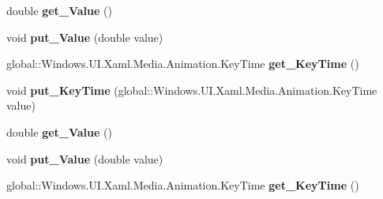 \begin{DoxyCompactItemize}
double {\bfseries get\+\_\+\+Value} ()
\item 
\mbox{\label{interface_windows_1_1_u_i_1_1_xaml_1_1_media_1_1_animation_1_1_i_double_key_frame_a2e2235aea49078188c36c1f9080d58a9}} 
void {\bfseries put\+\_\+\+Value} (double value)
\item 
\mbox{\label{interface_windows_1_1_u_i_1_1_xaml_1_1_media_1_1_animation_1_1_i_double_key_frame_acbf6eb01d1f5653483101308780bcf9c}} 
global\+::\+Windows.\+U\+I.\+Xaml.\+Media.\+Animation.\+Key\+Time {\bfseries get\+\_\+\+Key\+Time} ()
\item 
\mbox{\label{interface_windows_1_1_u_i_1_1_xaml_1_1_media_1_1_animation_1_1_i_double_key_frame_a2a3791646e36b2ce46d0900686e544f5}} 
void {\bfseries put\+\_\+\+Key\+Time} (global\+::\+Windows.\+U\+I.\+Xaml.\+Media.\+Animation.\+Key\+Time value)
\item 
\mbox{\label{interface_windows_1_1_u_i_1_1_xaml_1_1_media_1_1_animation_1_1_i_double_key_frame_aa6f676c3479f134fab59f2ae812e3ffd}} 
double {\bfseries get\+\_\+\+Value} ()
\item 
\mbox{\label{interface_windows_1_1_u_i_1_1_xaml_1_1_media_1_1_animation_1_1_i_double_key_frame_a2e2235aea49078188c36c1f9080d58a9}} 
void {\bfseries put\+\_\+\+Value} (double value)
\item 
\mbox{\label{interface_windows_1_1_u_i_1_1_xaml_1_1_media_1_1_animation_1_1_i_double_key_frame_acbf6eb01d1f5653483101308780bcf9c}} 
global\+::\+Windows.\+U\+I.\+Xaml.\+Media.\+Animation.\+Key\+Time {\bfseries get\+\_\+\+Key\+Time} ()
\item 
\mbox{\label{interface_windows_1_1_u_i_1_1_xaml_1_1_media_1_1_animation_1_1_i_double_key_frame_a2a3791646e36b2ce46d0900686e544f5}} 

\end{DoxyCompactItemize}
